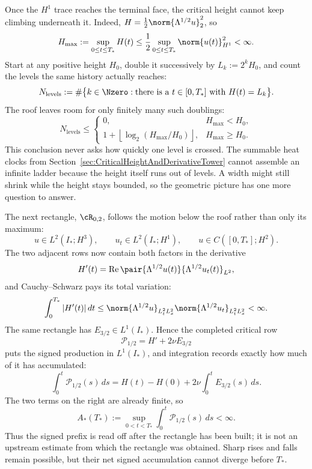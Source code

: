 Once the \(H^1\) trace reaches the terminal face, the critical height cannot keep
climbing underneath it.  Indeed,
\(H=\tfrac12\norm{\Lambda^{1/2}u}_2^2\), so
\begin{equation}\label{eq:BodyCriticalHeightRoof}
  H_{\max}
  :=\sup_{0\leq t\leq T_*}H(t)
  \leq\frac12\sup_{0\leq t\leq T_*}\norm{u(t)}_{H^1}^2
  <\infty.
\end{equation}
Start at any positive height \(H_0\), double it successively by
\(L_k:=2^kH_0\), and count the levels the same history actually reaches:
\[
  N_{\mathrm{levels}}
  :=
  \#\bigl\{k\in\Nzero:\text{there is a }t\in[0,T_*]\text{ with }H(t)=L_k\bigr\}.
\]
The roof leaves room for only finitely many such doublings:
\begin{equation}\label{eq:BodyFiniteZenoOctaveCount}
  N_{\mathrm{levels}}
  \leq
  \begin{cases}
    0,&H_{\max}<H_0,\\
    1+\left\lfloor\log_2(H_{\max}/H_0)\right\rfloor,
      &H_{\max}\geq H_0.
  \end{cases}
\end{equation}
This conclusion never asks how quickly one level is crossed.
The summable heat clocks from Section~\ref{sec:CriticalHeightAndDerivativeTower} cannot
assemble an infinite ladder because the height itself runs out of levels.
A width might still shrink while the height stays bounded, so the geometric
picture has one more question to answer.

The next rectangle, \(\cR_{0,2}\), follows the motion below the roof rather than
only its maximum:
\begin{equation}\label{eq:LowRectangleZeroTwo}
  u\in L^2(I_*;H^3),
  \qquad
  u_t\in L^2(I_*;H^1),
  \qquad
  u\in C([0,T_*];H^2).
\end{equation}
The two adjacent rows now contain both factors in the derivative
\[
  H'(t)
  =\operatorname{Re}
  \pair{\Lambda^{1/2}u(t)}{\Lambda^{1/2}u_t(t)}_{L^2},
\]
and Cauchy--Schwarz pays its total variation:
\begin{equation}\label{eq:CriticalHeightTotalVariationBound}
  \int_0^{T_*}|H'(t)|\,dt
  \leq
  \norm{\Lambda^{1/2}u}_{L^2_tL^2_x}
  \norm{\Lambda^{1/2}u_t}_{L^2_tL^2_x}
  <\infty.
\end{equation}
The same rectangle has \(E_{3/2}\in L^1(I_*)\).  Hence the completed critical row
\[
  \mathcal P_{1/2}=H'+2\nu E_{3/2}
\]
puts the signed production in \(L^1(I_*)\), and integration records exactly how
much of it has accumulated:
\begin{equation}\label{eq:BodySignedCriticalPrefix}
  \int_0^t\mathcal P_{1/2}(s)\,ds
  =H(t)-H(0)+2\nu\int_0^tE_{3/2}(s)\,ds.
\end{equation}
The two terms on the right are already finite, so
\begin{equation}\label{eq:BodySignedCriticalPrefixBound}
  A_*(T_*)
  :=\sup_{0<t<T_*}\int_0^t\mathcal P_{1/2}(s)\,ds
  <\infty.
\end{equation}
Thus the signed prefix is read off after the rectangle has been built; it is not
an upstream estimate from which the rectangle was obtained.
Sharp rises and falls remain possible, but their net signed accumulation cannot
diverge before \(T_*\).

